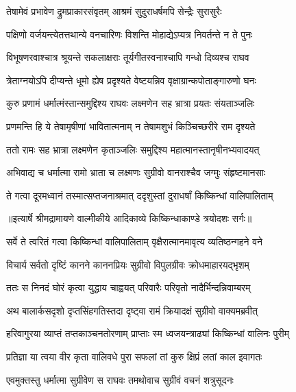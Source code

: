 \twolineshloka
{तेषामेवं प्रभावेण द्रुमप्राकारसंवृतम्}
{आश्रमं सुदुराधर्षमपि सेन्द्रैः सुरासुरैः} %

\twolineshloka
{पक्षिणो वर्जयन्त्येतत्तथान्ये वनचारिणः}
{विशन्ति मोहाद्येऽप्यत्र निवर्तन्ते न ते पुनः} %

\twolineshloka
{विभूषणरवाश्चात्र श्रूयन्ते सकलाक्षराः}
{तूर्यगीतस्वनाश्चापि गन्धो दिव्यश्च राघव} %

\twolineshloka
{त्रेताग्नयोऽपि दीप्यन्ते धूमो ह्येष प्रदृश्यते}
{वेष्टयन्निव वृक्षाग्रान्कपोताङ्गारुणो घनः} %

\twolineshloka
{कुरु प्रणामं धर्मात्मंस्तान्समुद्दिश्य राघवः}
{लक्ष्मणेन सह भ्रात्रा प्रयतः संयताञ्जलिः} %

\twolineshloka
{प्रणमन्ति हि ये तेषामृषीणां भावितात्मनाम्}
{न तेषामशुभं किञ्चिच्छरीरे राम दृश्यते} %

\twolineshloka
{ततो रामः सह भ्रात्रा लक्ष्मणेन कृताञ्जलिः}
{समुद्दिश्य महात्मानस्तानृषीनभ्यवादयत्} %

\twolineshloka
{अभिवाद्य च धर्मात्मा रामो भ्राता च लक्ष्मणः}
{सुग्रीवो वानराश्चैव जग्मुः संहृष्टमानसाः} %

\twolineshloka
{ते गत्वा दूरमध्वानं तस्मात्सप्तजनाश्रमात्}
{ददृशुस्तां दुराधर्षां किष्किन्धां वालिपालिताम्} %


{॥इत्यार्षे श्रीमद्रामायणे वाल्मीकीये आदिकाव्ये किष्किन्धाकाण्डे त्रयोदशः सर्गः॥}


\twolineshloka
{सर्वे ते त्वरितं गत्वा किष्किन्धां वालिपालिताम्}
{वृक्षैरात्मानमावृत्य व्यतिष्ठन्गहने वने} %

\twolineshloka
{विचार्य सर्वतो दृष्टिं कानने काननप्रियः}
{सुग्रीवो विपुलग्रीवः क्रोधमाहारयद्भृशम्} %

\twolineshloka
{ततः स निनदं घोरं कृत्वा युद्धाय चाह्वयत्}
{परिवारैः परिवृतो नादैर्भिन्दन्निवाम्बरम्} %

\twolineshloka
{अथ बालार्कसदृशो दृप्तसिंहगतिस्तदा}
{दृष्ट्वा रामं क्रियादक्षं सुग्रीवो वाक्यमब्रवीत्} %

\twolineshloka
{हरिवागुरया व्याप्तं तप्तकाञ्चनतोरणाम्}
{प्राप्ताः स्म ध्वजयन्त्राढ्यां किष्किन्धां वालिनः पुरीम्} %

\twolineshloka
{प्रतिज्ञा या त्वया वीर कृता वालिवधे पुरा}
{सफलां तां कुरु क्षिप्रं लतां काल इवागतः} %

\twolineshloka
{एवमुक्तस्तु धर्मात्मा सुग्रीवेण स राघवः}
{तमथोवाच सुग्रीवं वचनं शत्रुसूदनः} %

